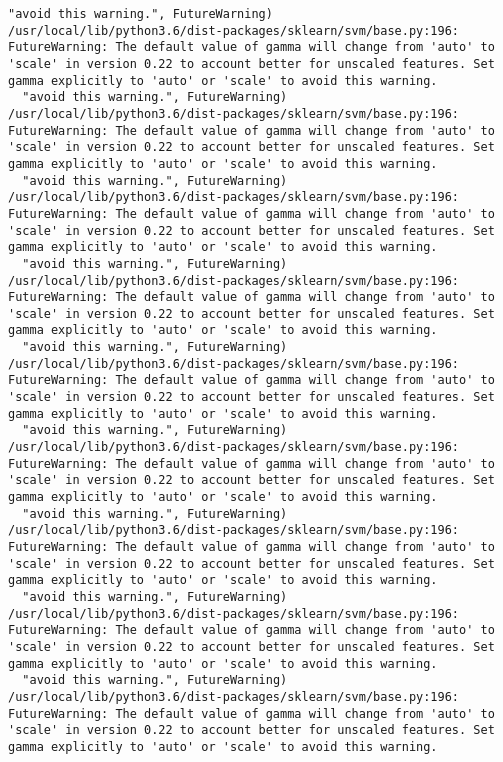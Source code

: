 \documentclass[11pt]{article}
\begin{document}
\begin{Verbatim}[commandchars=\\\{\}]
  "avoid this warning.", FutureWarning)
/usr/local/lib/python3.6/dist-packages/sklearn/svm/base.py:196: FutureWarning: The default value of gamma will change from 'auto' to 'scale' in version 0.22 to account better for unscaled features. Set gamma explicitly to 'auto' or 'scale' to avoid this warning.
  "avoid this warning.", FutureWarning)
/usr/local/lib/python3.6/dist-packages/sklearn/svm/base.py:196: FutureWarning: The default value of gamma will change from 'auto' to 'scale' in version 0.22 to account better for unscaled features. Set gamma explicitly to 'auto' or 'scale' to avoid this warning.
  "avoid this warning.", FutureWarning)
/usr/local/lib/python3.6/dist-packages/sklearn/svm/base.py:196: FutureWarning: The default value of gamma will change from 'auto' to 'scale' in version 0.22 to account better for unscaled features. Set gamma explicitly to 'auto' or 'scale' to avoid this warning.
  "avoid this warning.", FutureWarning)
/usr/local/lib/python3.6/dist-packages/sklearn/svm/base.py:196: FutureWarning: The default value of gamma will change from 'auto' to 'scale' in version 0.22 to account better for unscaled features. Set gamma explicitly to 'auto' or 'scale' to avoid this warning.
  "avoid this warning.", FutureWarning)
/usr/local/lib/python3.6/dist-packages/sklearn/svm/base.py:196: FutureWarning: The default value of gamma will change from 'auto' to 'scale' in version 0.22 to account better for unscaled features. Set gamma explicitly to 'auto' or 'scale' to avoid this warning.
  "avoid this warning.", FutureWarning)
/usr/local/lib/python3.6/dist-packages/sklearn/svm/base.py:196: FutureWarning: The default value of gamma will change from 'auto' to 'scale' in version 0.22 to account better for unscaled features. Set gamma explicitly to 'auto' or 'scale' to avoid this warning.
  "avoid this warning.", FutureWarning)
/usr/local/lib/python3.6/dist-packages/sklearn/svm/base.py:196: FutureWarning: The default value of gamma will change from 'auto' to 'scale' in version 0.22 to account better for unscaled features. Set gamma explicitly to 'auto' or 'scale' to avoid this warning.
  "avoid this warning.", FutureWarning)
/usr/local/lib/python3.6/dist-packages/sklearn/svm/base.py:196: FutureWarning: The default value of gamma will change from 'auto' to 'scale' in version 0.22 to account better for unscaled features. Set gamma explicitly to 'auto' or 'scale' to avoid this warning.
  "avoid this warning.", FutureWarning)
/usr/local/lib/python3.6/dist-packages/sklearn/svm/base.py:196: FutureWarning: The default value of gamma will change from 'auto' to 'scale' in version 0.22 to account better for unscaled features. Set gamma explicitly to 'auto' or 'scale' to avoid this warning.

\end{Verbatim}
\end{document}
